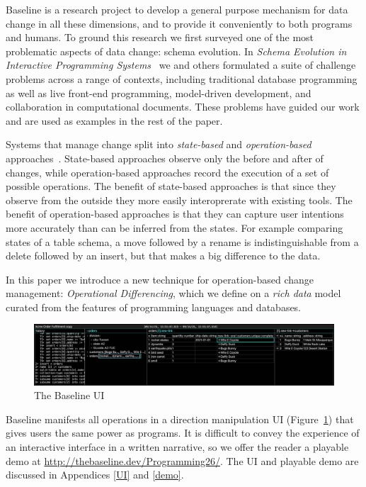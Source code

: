 \documentclass[english,submission]{programming}
\theoremstyle{definition}
\begin{document}
Baseline is a research project to develop a general purpose mechanism for data change in all these dimensions, and to provide it conveniently to both programs and humans.
To ground this research we first surveyed one of the most problematic aspects of data change: schema evolution. In \textit{Schema Evolution in Interactive Programming Systems}~\cite{challenge-problems} we and others formulated a suite of challenge problems across a range of contexts, including traditional database programming as well as live front-end programming, model-driven development, and collaboration in computational documents. These problems have guided our work and are used as examples in the rest of the paper.

Systems that manage change split into \textit{state-based} and \textit{operation-based} approaches~\cite{diff3, Shapiro11, edit-lenses}. State-based approaches observe only the before and after of changes, while operation-based approaches record the execution of a set of possible operations.
The benefit of state-based approaches is that since they observe from the outside they more easily interoprerate with existing tools.
The benefit of operation-based approaches is that they can capture user intentions more accurately than can be inferred from the states. For example comparing states of a table schema, a move followed by a rename is indistinguishable from a delete followed by an insert, but that makes a big difference to the data.

In this paper we introduce a new technique for operation-based change management: \textit{Operational Differencing}, which we define on a \textit{rich data} model curated from the features of programming languages and databases.

\begin{figure}
\includegraphics[width=\textwidth]{GUI.png}
\caption{The Baseline UI}
\label{fig:UI-plain}
\end{figure}

Baseline manifests all operations in a direction manipulation UI (Figure~\ref{fig:UI-plain}) that gives users the same power as programs. It is difficult to convey the experience of an interactive interface in a written narrative, so we offer the reader a playable demo at \url{http://thebaseline.dev/Programming26/}. The UI and playable demo are discussed in Appendices \ref{UI} and \ref{demo}.
\end{document}
